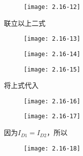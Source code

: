 \begin{figure}[H] %
	\begin{minipage}{\linewidth}
		\texttt{[image: 2.16-12]}
	\end{minipage}
\end{figure}

联立以上二式

\begin{figure}[H] %
	\begin{minipage}{\linewidth}
		\texttt{[image: 2.16-13]}
	\end{minipage}
\end{figure}

\begin{figure}[H] %
	\begin{minipage}{\linewidth}
		\texttt{[image: 2.16-14]}
	\end{minipage}
\end{figure}

\begin{figure}[H] %
	\begin{minipage}{\linewidth}
		\texttt{[image: 2.16-15]}
	\end{minipage}
\end{figure}

将上式代入

\begin{figure}[H] %
	\begin{minipage}{\linewidth}
		\texttt{[image: 2.16-16]}
	\end{minipage}
\end{figure}

\begin{figure}[H] %
	\begin{minipage}{\linewidth}
		\texttt{[image: 2.16-17]}
	\end{minipage}
\end{figure}

因为$I_{D1}=I_{D2}$，所以

\begin{figure}[H] %
	\begin{minipage}{\linewidth}
		\texttt{[image: 2.16-18]}
	\end{minipage}
\end{figure}

